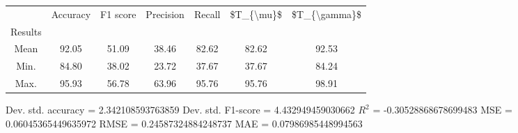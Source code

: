 \begin{tabular}{|c|c|c|c|c|c|c|}
\toprule
{} &  Accuracy &  F1 score &  Precision &  Recall &  \$T\_\{\textbackslash mu\}\$ &  \$T\_\{\textbackslash gamma\}\$ \\
Results &           &           &            &         &            &               \\
\hline
Mean    &     92.05 &     51.09 &      38.46 &   82.62 &      82.62 &         92.53 \\
Min.    &     84.80 &     38.02 &      23.72 &   37.67 &      37.67 &         84.24 \\
Max.    &     95.93 &     56.78 &      63.96 &   95.76 &      95.76 &         98.91 \\
\bottomrule
\end{tabular}

 Dev. std. accuracy = 2.342108593763859
 Dev. std. F1-score = 4.432949459030662
 $R^2$ = -0.30528868678699483
 MSE = 0.06045365449635972
 RMSE = 0.24587324884248737
 MAE = 0.07986985448994563